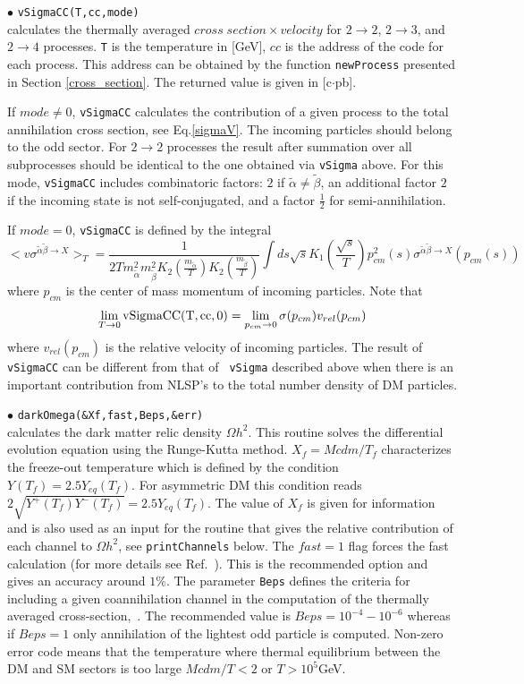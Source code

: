 \documentclass[12pt,a4paper]{article}
\begin{document}
 

\noindent
 $\bullet$    \verb|vSigmaCC(T,cc,mode)|\\
  calculates  the thermally  averaged  $cross\; section
\times velocity$ for $2\to2$, $2\to3$, and $2\to4$ processes. \verb|T| is the temperature in
[GeV],  $cc$ is the address of the code for each process. This address
can be obtained by the function {\tt newProcess} presented in  Section
\ref{cross_section}. The returned value  is given in [c$\cdot$pb]. 

 If $mode\ne 0$, \verb|vSigmaCC|  calculates  the contribution of a given
process to the total annihilation cross section,  see Eq.\ref{sigmaV}. The
 incoming particles should belong to the odd sector.  For $2\to2$ processes the result after summation over all subprocesses  should
be identical to the one obtained via {\tt vSigma}  above. For this mode,
\verb|vSigmaCC|  includes combinatoric factors: $2$ if $\tilde\alpha \ne
\tilde\beta$, an additional factor $2$ if the incoming state is not self-conjugated, and a factor
$\frac{1}{2}$  for semi-annihilation.   

If $mode=0$, {\tt vSigmaCC} is  defined by the integral
$$ <v \sigma^{\tilde\alpha\tilde\beta\to X}>_T=  \frac{1}{2 T
m_{\tilde\alpha}^2 m_{\tilde\beta}^2
K_2(\frac{m_{\tilde\alpha}}{T})K_2(\frac{m_{\tilde\beta}}{T})} \int ds \sqrt{s}
K_1(\frac{\sqrt{s}}{T})p_{cm}^2(s)\sigma^{\tilde\alpha\tilde\beta\to X}(p_{cm}(s))$$  
where $p_{cm}$ is the center of mass momentum of incoming particles.  Note that
$$\lim_{T\to 0} {\rm vSigmaCC(T,cc,0)}=\lim_{p_{cm}\to 0} \sigma(p_{cm}) v_{rel}(p_{cm}) $$ 
where   $v_{rel}(p_{cm})$ is the relative velocity of incoming particles.   The
result of {\tt vSigmaCC} can be different from that of {\tt
vSigma} described  above when there is an important contribution from NLSP's to the total
number density of DM particles. 
 
\noindent 
$\bullet$ \verb|darkOmega(&Xf,fast,Beps,&err)|\\
calculates the dark matter relic density $\Omega h^2$. 
This routine  solves the differential evolution equation  using the Runge-Kutta method. 
$X_f=Mcdm/T_{f}$
characterizes the freeze-out temperature  which is defined by the
condition $Y(T_f)=2.5Y_{eq}(T_f)$. For  asymmetric  DM this condition
reads $2\sqrt{Y^+(T_f)Y^-(T_f)}=2.5Y_{eq}(T_f)$.  The value of $X_f$ is given for
information and is also used as an input for the routine that
gives the relative contribution of each channel to $\Omega h^2$,
see \verb|printChannels|  below. The  $fast=1$ flag forces the
fast calculation (for more details see
Ref.~\cite{Belanger:2004yn}). This is the recommended option and
gives an accuracy around $1\%$. The parameter {\tt Beps} defines the
criteria for including a given coannihilation channel in the computation of the
thermally averaged cross-section,~\cite{Belanger:2004yn}.   The
recommended value is $Beps=10^{-4} - 10^{-6}$ whereas 
if $Beps=1$ only annihilation of the
lightest odd particle is computed. Non-zero error code means that the temperature where thermal equilibrium between the DM and SM sectors is too large  $Mcdm/T < 2$  or
$T>10^{5}$GeV. 
\end{document}

